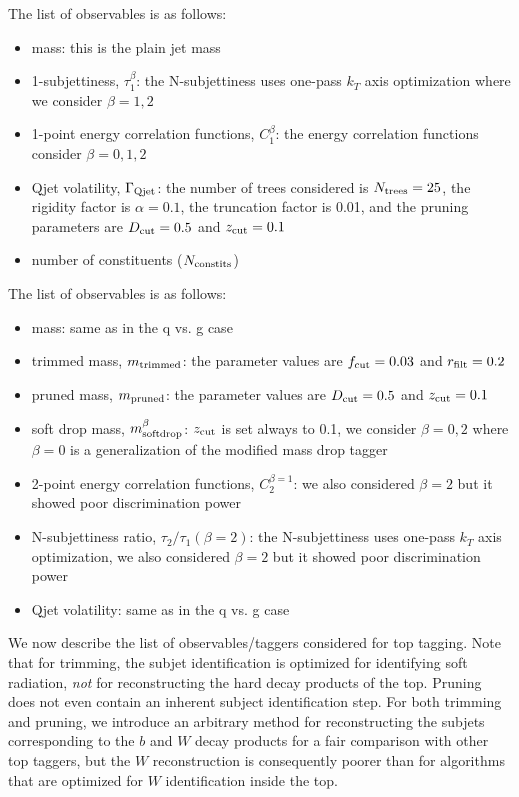   The list of observables  is as follows: 
\begin{itemize}
\item mass: this is the plain jet mass
\item 1-subjettiness, $\tau_1^{\beta}$: the N-subjettiness uses one-pass $k_T$ axis optimization where we consider $\beta = 1,2$
\item 1-point energy correlation functions, $C_1^\beta$: the energy correlation functions consider $\beta=0,1,2$
\item Qjet volatility, $\Gamma_{\rm Qjet}$: the number of trees considered is $N_{\rm trees} = 25$, the rigidity factor is $\alpha = 0.1$, the truncation factor is 0.01, and the pruning parameters are $D_{\rm cut} = 0.5$ and $z_{\rm cut} = 0.1$
\item number of constituents ($N_{\rm constits}$)
\end{itemize}

 The list of observables is as follows: 
\begin{itemize}
\item mass: same as in the q vs. g case
\item trimmed mass, $m_{\rm trimmed}$: the parameter values are $f_{\rm cut} = 0.03$ and $r_{\rm filt} = 0.2$
\item pruned mass, $m_{\rm pruned}$: the parameter values are $D_{\rm cut} = 0.5$ and $z_{\rm cut} = 0.1$
\item soft drop mass, $m_{\rm soft drop}^{\beta}$: $z_{\rm cut}$ is set always to 0.1, we consider $\beta=0,2$ where $\beta=0$ is a generalization of the modified mass drop tagger
\item 2-point energy correlation functions, $C_2^{\beta=1}$: we also considered $\beta=2$ but it showed poor discrimination power
\item N-subjettiness ratio, $\tau_2 / \tau_1 (\beta = 2)$: the N-subjettiness uses one-pass $k_T$ axis optimization, we also considered $\beta=2$ but it showed poor discrimination power
\item Qjet volatility: same as in the q vs. g case
\end{itemize}

 We now describe the list of observables/taggers considered for top tagging. Note that for trimming, the subjet identification is optimized for identifying soft radiation, \emph{not} for reconstructing the hard decay products of the top. Pruning does not even contain an inherent subject identification step. For both trimming and pruning, we introduce an arbitrary method for reconstructing the subjets corresponding to the $b$ and $W$ decay products for a fair comparison with other top taggers, but the $W$ reconstruction is consequently poorer than for algorithms that are optimized for $W$ identification inside the top.\\

